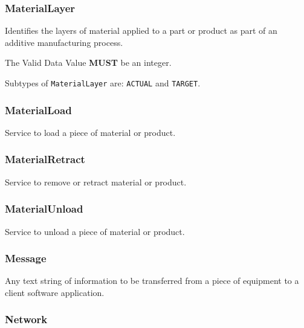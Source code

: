 \FloatBarrier

\subsubsection{MaterialLayer}
  \label{sec:MaterialLayer}



Identifies the layers of material applied to a part or product as part of an additive manufacturing process.
  
 The \gls{Valid Data Value} \textbf{MUST} be an integer.


Subtypes of \texttt{MaterialLayer} are: \texttt{ACTUAL} and \texttt{TARGET}. 
\FloatBarrier

\subsubsection{MaterialLoad}
  \label{sec:MaterialLoad}



Service to load a piece of material or product.

\FloatBarrier

\subsubsection{MaterialRetract}
  \label{sec:MaterialRetract}



Service to remove or retract material or product.

\FloatBarrier

\subsubsection{MaterialUnload}
  \label{sec:MaterialUnload}



Service to unload a piece of material or product.

\FloatBarrier

\subsubsection{Message}
  \label{sec:Message}



Any text string of information to be transferred from a piece of equipment to a client software application.

\FloatBarrier

\subsubsection{Network}
  \label{sec:Network}



